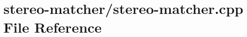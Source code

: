 \hypertarget{stereo-matcher_8cpp}{}\section{stereo-\/matcher/stereo-\/matcher.cpp File Reference}
\label{stereo-matcher_8cpp}
